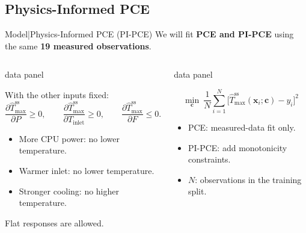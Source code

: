 \subsection{Physics-Informed PCE}

\begin{frame}{Model\enspace|\enspace Physics-Informed PCE (PI-PCE)}
  {\small We will fit \textbf{PCE and PI-PCE} using the same \textbf{19 measured observations}.}
  \medskip
  \begin{columns}[T,onlytextwidth]
      \begin{beamercolorbox}[sep=2mm,wd=\linewidth]{data panel}
        \begin{minipage}[t][40mm][t]{\dimexpr\linewidth-4mm\relax}
          \small
          With the other inputs fixed:
          \[
            \frac{\partial\widehat T_{\max}^{\mathrm{ss}}}{\partial P}\geq0,
            \qquad
            \frac{\partial\widehat T_{\max}^{\mathrm{ss}}}{\partial T_{\mathrm{inlet}}}\geq0,
            \qquad
            \frac{\partial\widehat T_{\max}^{\mathrm{ss}}}{\partial F}\leq0.
          \]
          \begin{itemize}
            \item More CPU power: no lower temperature.
            \item Warmer inlet: no lower temperature.
            \item Stronger cooling: no higher temperature.
          \end{itemize}
          \footnotesize Flat responses are allowed.
        \end{minipage}
      \end{beamercolorbox}
      \begin{beamercolorbox}[sep=2mm,wd=\linewidth]{data panel}
        \begin{minipage}[t][40mm][t]{\dimexpr\linewidth-4mm\relax}
          \small
          \[
            \min_{\mathbf c}\ \frac1N\sum_{i=1}^{N}
              \bigl[\widehat T_{\max}^{\mathrm{ss}}(\mathbf x_i;\mathbf c)-y_i\bigr]^2
          \]
          \par
          \raggedright
          \begin{itemize}
            \item PCE: measured-data fit only.
            \item PI-PCE: add monotonicity constraints.
            \item $N$: observations in the training split.
          \end{itemize}
        \end{minipage}
      \end{beamercolorbox}
  \end{columns}
\end{frame}

